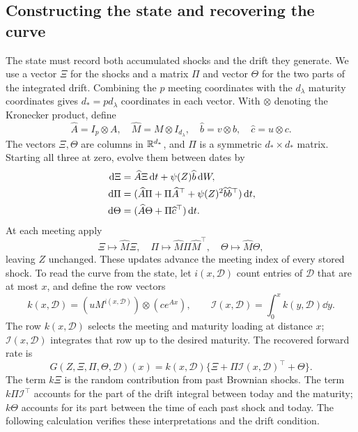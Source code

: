 \subsection{Constructing the state and recovering the curve}
The state must record both accumulated shocks and the drift they generate. We use a vector $\Xi$ for the shocks and a matrix $\Pi$ and vector $\Theta$ for the two parts of the integrated drift. Combining the $p$ meeting coordinates with the $d_\lambda$ maturity coordinates gives $d_*=p d_\lambda$ coordinates in each vector. With $\otimes$ denoting the Kronecker product, define
\[
\widehat A=I_p\otimes A,\quad \widehat M=M\otimes I_{d_\lambda},\quad
\widehat b=v\otimes b,\quad \widehat c=u\otimes c.
\]
The vectors $\Xi,\Theta$ are columns in $\mathbb R^{d_*}$, and $\Pi$ is a symmetric $d_*\times d_*$ matrix. Starting all three at zero, evolve them between dates by
\begin{align}
\,\mathrm d\Xi&=\widehat A\Xi\,\mathrm d t+\psi(Z)\widehat b\,\mathrm d W,\notag\\
\,\mathrm d\Pi&=(\widehat A\Pi+\Pi\widehat A^\top+\psi(Z)^2\widehat b\widehat b^\top)\,\mathrm d t,\label{eq:state}\\
\,\mathrm d\Theta&=(\widehat A\Theta+\Pi\widehat c^\top)\,\mathrm d t.\notag
\end{align}
At each meeting apply
\begin{equation}
\Xi\mapsto\widehat M\Xi,\quad
\Pi\mapsto\widehat M\Pi\widehat M^\top,\quad
\Theta\mapsto\widehat M\Theta,\label{eq:restart}
\end{equation}
leaving $Z$ unchanged. These updates advance the meeting index of every stored shock. To read the curve from the state, let $i(x,\mathcal D)$ count entries of $\mathcal D$ that are at most $x$, and define the row vectors
\[
k(x,\mathcal D)=(uM^{i(x,\mathcal D)})\otimes(c e^{Ax}),\qquad
\mathcal I(x,\mathcal D)=\int_0^x k(y,\mathcal D)\dd y.
\]
The row $k(x,\mathcal D)$ selects the meeting and maturity loading at distance $x$; $\mathcal I(x,\mathcal D)$ integrates that row up to the desired maturity. The recovered forward rate is
\begin{equation}
G(Z,\Xi,\Pi,\Theta,\mathcal D)(x)
 =k(x,\mathcal D)\{\Xi+\Pi \mathcal I(x,\mathcal D)^\top+\Theta\}.\label{eq:curvemap}
\end{equation}
The term $k\Xi$ is the random contribution from past Brownian shocks. The term $k\Pi \mathcal I^\top$ accounts for the part of the drift integral between today and the maturity; $k\Theta$ accounts for its part between the time of each past shock and today. The following calculation verifies these interpretations and the drift condition.

